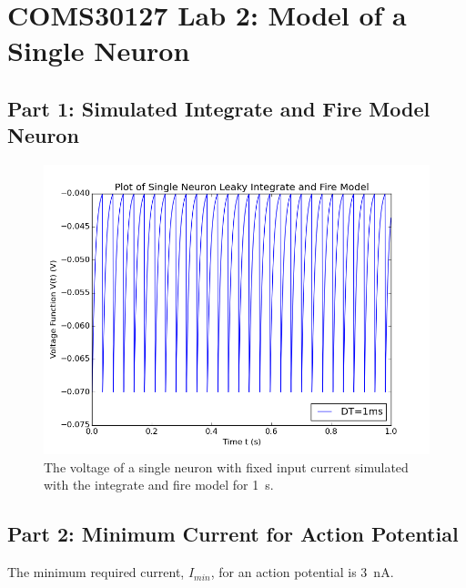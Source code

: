 \documentclass[a4paper, 10pt]{article}
\begin{document}
\section*{COMS30127 Lab 2: Model of a Single Neuron}

\subsection*{Part 1: Simulated Integrate and Fire Model Neuron}
\begin{figure}[H]
  \centering
  \includegraphics[scale=0.4]{p1.png}
  \caption{The voltage of a single neuron with fixed input current simulated with the integrate and fire model for \SI{1}{\second}.}
  \label{fig:n1}
\end{figure}

\subsection*{Part 2: Minimum Current for Action Potential}

The minimum required current, \(I_{min}\), for an action potential is \SI{3}{\nano\ampere}.
\end{document}
